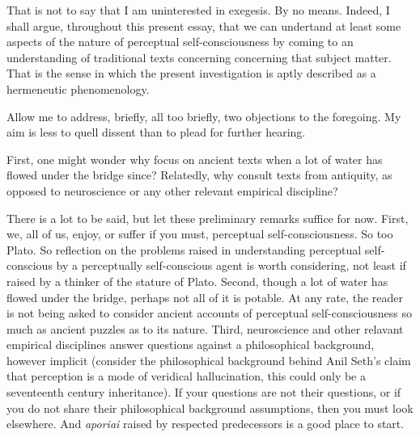 That is not to say that I am uninterested in exegesis. By no means. Indeed, I shall argue, throughout this present essay, that we can undertand at least some aspects of the nature of perceptual self-consciousness by coming to an understanding of traditional texts concerning concerning that subject matter. That is the sense in which the present investigation is aptly described as a hermeneutic phenomenology. 

Allow me to address, briefly, all too briefly, two objections to the foregoing. My aim is less to quell dissent than to plead for further hearing. 

First, one might wonder why focus on ancient texts when a lot of water has flowed under the bridge since? Relatedly, why consult texts from antiquity, as opposed to neuroscience or any other relevant empirical discipline?

There is a lot to be said, but let these preliminary remarks suffice for now. First, we, all of us, enjoy, or suffer if you must, perceptual self-consciousness. So too Plato. So reflection on the problems raised in understanding perceptual self-conscious by a perceptually self-conscious agent is worth considering, not least if raised by a thinker of the stature of Plato. Second, though a lot of water has flowed under the bridge, perhaps not all of it is potable. At any rate, the reader is not being asked to consider ancient accounts of perceptual self-consciousness so much as ancient puzzles as to its nature. Third, neuroscience and other relavant empirical disciplines answer questions against a philosophical background, however implicit (consider the philosophical background behind Anil Seth's claim that perception is a mode of veridical hallucination, this could only be a seventeenth century inheritance). If your questions are not their questions, or if you do not share their philosophical background assumptions, then you must look elsewhere. And \emph{aporiai} raised by respected predecessors is a good place to start.

